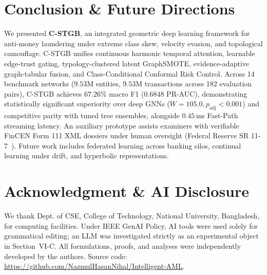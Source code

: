 \section{Conclusion \& Future Directions}
\label{sec:conclusion}
We presented \textbf{C-STGB}, an integrated geometric deep learning framework for anti-money laundering under extreme class skew, velocity evasion, and topological camouflage. C-STGB unifies continuous harmonic temporal attention, learnable edge-trust gating, typology-clustered latent GraphSMOTE, evidence-adaptive graph-tabular fusion, and Class-Conditional Conformal Risk Control. Across 14 benchmark networks ($9.53\text{M}$ entities, $9.53\text{M}$ transactions across 182 evaluation pairs), C-STGB achieves $67.26\%$ macro F1 ($0.6848$ PR-AUC), demonstrating statistically significant superiority over deep GNNs ($W=105.0, p_{\text{adj}} < 0.001$) and competitive parity with tuned tree ensembles, alongside $0.45$\,ms Fast-Path streaming latency. An auxiliary prototype assists examiners with verifiable FinCEN Form 111 XML dossiers under human oversight (Federal Reserve SR 11-7~\cite{fed2011sr117}). Future work includes federated learning across banking silos, continual learning under drift, and hyperbolic representations.

\vspace{-1.2ex}
\section*{Acknowledgment \& AI Disclosure}
{\footnotesize
We thank Dept. of CSE, College of Technology, National University, Bangladesh, for computing facilities. Under IEEE GenAI Policy, AI tools were used solely for grammatical editing; an LLM was investigated strictly as an experimental object in Section~VI-C. All formulations, proofs, and analyses were independently developed by the authors. Source code: \url{https://github.com/NazmulHasanNihal/Intelligent-AML}.\par
}
